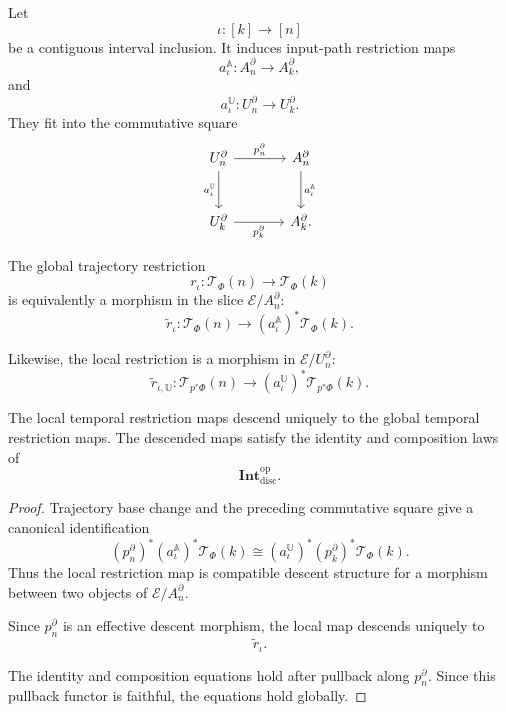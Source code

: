 Let
\[
    \iota:[k]\to[n]
\]
be a contiguous interval inclusion. It induces input-path restriction maps
\[
    a_\iota^{\mathbb A}:
    A_n^\partial\to A_k^\partial,
\]
and
\[
    a_\iota^{\mathbb U}:
    U_n^\partial\to U_k^\partial.
\]
They fit into the commutative square
\[
\begin{tikzcd}[column sep=large,row sep=large]
    U_n^\partial
        \arrow[r, "p_n^\partial"]
        \arrow[d, "a_\iota^{\mathbb U}"']
    &
    A_n^\partial
        \arrow[d, "a_\iota^{\mathbb A}"]
    \\
    U_k^\partial
        \arrow[r, "p_k^\partial"']
    &
    A_k^\partial.
\end{tikzcd}
\]

The global trajectory restriction
\[
    r_\iota:
    \mathscr T_\Phi(n)
    \to
    \mathscr T_\Phi(k)
\]
is equivalently a morphism in the slice
\(\mathcal E/A_n^\partial\):
\[
    \widetilde r_\iota:
    \mathscr T_\Phi(n)
    \to
    (a_\iota^{\mathbb A})^\ast
    \mathscr T_\Phi(k).
\]

Likewise, the local restriction is a morphism in
\(\mathcal E/U_n^\partial\):
\[
    \widetilde r_{\iota,\mathbb U}:
    \mathscr T_{p^\ast\Phi}(n)
    \to
    (a_\iota^{\mathbb U})^\ast
    \mathscr T_{p^\ast\Phi}(k).
\]

\begin{proposition}
\label{prop:descent-temporal-restrictions}
The local temporal restriction maps descend uniquely to the global temporal
restriction maps. The descended maps satisfy the identity and composition
laws of
\[
    \mathbf{Int}_{\mathrm{disc}}^{\mathrm{op}}.
\]
\end{proposition}

\begin{proof}
Trajectory base change and the preceding commutative square give a canonical
identification
\[
    (p_n^\partial)^\ast
    (a_\iota^{\mathbb A})^\ast\mathscr T_\Phi(k)
    \cong
    (a_\iota^{\mathbb U})^\ast
    (p_k^\partial)^\ast\mathscr T_\Phi(k).
\]
Thus the local restriction map is compatible descent structure for a morphism
between two objects of
\(\mathcal E/A_n^\partial\).

Since \(p_n^\partial\) is an effective descent morphism, the local map
descends uniquely to
\[
    \widetilde r_\iota.
\]

The identity and composition equations hold after pullback along
\(p_n^\partial\). Since this pullback functor is faithful, the equations hold
globally.
\end{proof}

